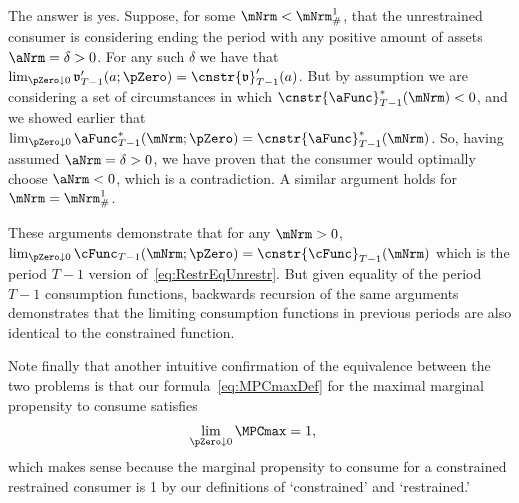 \documentclass[\econtexRoot/BufferStockTheory]{subfiles}
\begin{document}
The answer is yes.
Suppose, for some $\mNrm < \mNrm^{1}_{\#}$, that the unrestrained consumer is considering ending the period with any positive amount of assets $\aNrm=\delta > 0$.
For any such $\delta$ we have that $\lim_{\pZero \downarrow 0} \mathfrak{v}_{T-1}^{\prime}(a;\pZero)=\cnstr{\mathfrak{v}}_{T-1}^{\prime}(a)$.
But by assumption we are considering a set of circumstances in which $\cnstr{\aFunc}_{T-1}^{*}(\mNrm) < 0$, and we showed earlier that $\lim_{\pZero \downarrow 0} \aFunc_{T-1}^{*}(\mNrm;\pZero) = \cnstr{\aFunc}_{T-1}^{*}(\mNrm)$.
So, having assumed $\aNrm = \delta > 0$, we have proven that the consumer would optimally choose $\aNrm < 0$, which is a contradiction.
A similar argument holds for $\mNrm = \mNrm^{1}_{\#}$.

These arguments demonstrate that for any $\mNrm>0$, $\lim_{\pZero \downarrow 0} \cFunc_{T-1}(\mNrm;\pZero) = \cnstr{\cFunc}_{T-1}(\mNrm)$ which is the period $T-1$ version of~\eqref{eq:RestrEqUnrestr}.
But given equality of the period $T-1$ consumption functions, backwards recursion of the same arguments demonstrates that the limiting consumption functions in previous periods are also identical to the constrained function.

Note finally that another intuitive confirmation of the equivalence between the two problems is that our formula~\eqref{eq:MPCmaxDef} for the maximal marginal propensity to consume satisfies
\begin{eqnarray*}
  \lim_{\pZero \downarrow 0} \MPCmax  & = 1,
\end{eqnarray*}
which makes sense because the marginal propensity to consume for a constrained restrained consumer is 1 by our definitions of `constrained' and `restrained.'

\ifSubfilesClassLoaded{\bibfilesfind{\texname}}{}

\sloppy
\end{document}
